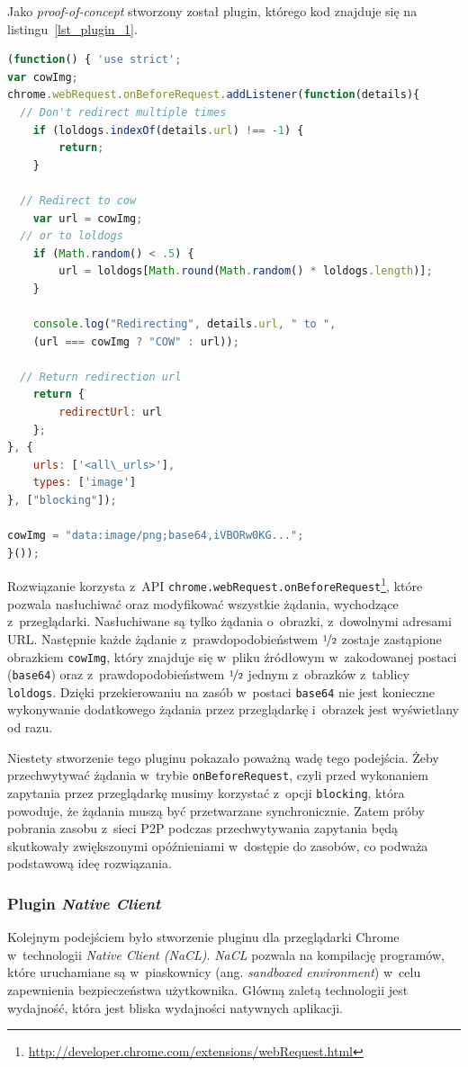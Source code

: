 \documentclass[a4paper,11pt]{scrartcl}
\newcommand{\f}{\texttt}
\begin{document}
Jako \textit{proof-of-concept} stworzony został plugin, którego kod znajduje się na listingu~\ref{lst_plugin_1}.

\begin{lstlisting}[language={JavaScript}, label={lst_plugin_1}, 
  caption={Kod rozszerzenia dla przeglądarki Chrome, realizujący \textit{proof-of-concept}.}]
(function() { 'use strict';
var cowImg;
chrome.webRequest.onBeforeRequest.addListener(function(details){
  // Don't redirect multiple times
	if (loldogs.indexOf(details.url) !== -1) {
		return;
	}
	
  // Redirect to cow
	var url = cowImg;
  // or to loldogs
	if (Math.random() < .5) {
		url = loldogs[Math.round(Math.random() * loldogs.length)];
	}
	
	console.log("Redirecting", details.url, " to ", 
    (url === cowImg ? "COW" : url));
    
  // Return redirection url
	return {
		redirectUrl: url
	};
}, {
	urls: ['<all\_urls>'],
	types: ['image']
}, ["blocking"]);

cowImg = "data:image/png;base64,iVBORw0KG...";
}());
\end{lstlisting}

Rozwiązanie korzysta z~API \f{chrome.webRequest.onBeforeRequest}\footnote{\url{http://developer.chrome.com/extensions/webRequest.html}}, które pozwala nasłuchiwać oraz modyfikować wszystkie żądania, wychodzące z~przeglądarki. Nasłuchiwane są tylko żądania o~obrazki, z~dowolnymi adresami URL. Następnie każde żądanie z~prawdopodobieństwem $\nicefrac{1}{2}$ zostaje zastąpione obrazkiem \f{cowImg}, który znajduje się w~pliku źródłowym w~zakodowanej postaci (\f{base64}) oraz z~prawdopodobieństwem $\nicefrac{1}{2}$ jednym z~obrazków z~tablicy \f{loldogs}. Dzięki przekierowaniu na zasób w~postaci \f{base64} nie jest konieczne wykonywanie dodatkowego żądania przez przeglądarkę i~obrazek jest wyświetlany od razu. 

Niestety stworzenie tego pluginu pokazało poważną wadę tego podejścia. Żeby przechwytywać żądania w~trybie \f{onBeforeRequest}, czyli przed wykonaniem zapytania przez przeglądarkę musimy korzystać z~opcji \f{blocking}, która powoduje, że żądania muszą być przetwarzane synchronicznie. Zatem próby pobrania zasobu z~sieci P2P podczas przechwytywania zapytania będą skutkowały zwiększonymi opóźnieniami w~dostępie do zasobów, co podważa podstawową ideę rozwiązania.

\subsubsection{Plugin \textit{Native Client}}
\label{sect_plugin_2}
Kolejnym podejściem było stworzenie pluginu dla przeglądarki Chrome w~technologii \textit{Native Client (NaCL)}. \textit{NaCL} pozwala na kompilację programów, które uruchamiane są w~piaskownicy (ang. \textit{sandboxed environment}) w~celu zapewnienia bezpieczeństwa użytkownika. Główną zaletą technologii jest wydajność, która jest bliska wydajności natywnych aplikacji.
\end{document}
